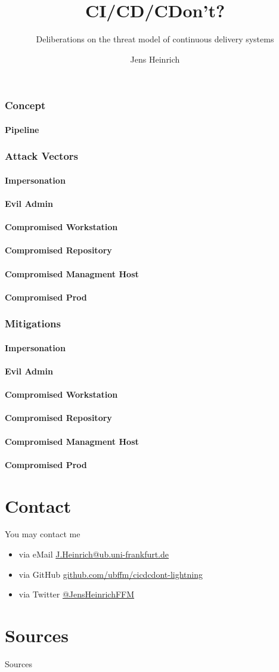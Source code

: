 \documentclass{beamer}
\title{CI/CD/CDon't?}
\subtitle{Deliberations on the threat model of continuous delivery systems}
\date[%
	{\includegraphics[
			keepaspectratio,
			height=3pt
			]
			{cyber.png}
			}%
		CiderSecCon
]{2020--03--14/15\\%
	{\includegraphics[
			keepaspectratio,
			height=7pt
			]
			{cyber.png}
			}%
		CiderSecCon}
\institute[UBFFM]{\href{https://www.ub.uni-frankfurt.de}{Universit\"atsbibliothek Johann Christian Senckenberg}}
\author[J
	{\includegraphics[
		keepaspectratio,
		height=4pt
		]
		{icon.png}
		}
		]{Jens Heinrich}
\begin{document}
\begin{frame}
	\titlepage
\end{frame}

\begin{frame}
	\frametitle<1-1>{Concept}
	\framesubtitle<1-1>{Pipeline}
	\frametitle<2-7>{Attack Vectors}
	\framesubtitle<2-2>{Impersonation}
	\framesubtitle<3-3>{Evil Admin}
	\framesubtitle<4-4>{Compromised Workstation}
	\framesubtitle<5-5>{Compromised Repository}
	\framesubtitle<6-6>{Compromised Managment Host}
	\framesubtitle<7-7>{Compromised Prod}
	\frametitle<8-13>{Mitigations}
	\framesubtitle<8-8>{Impersonation}
	\framesubtitle<9-9>{Evil Admin}
	\framesubtitle<10-10>{Compromised Workstation}
	\framesubtitle<11-11>{Compromised Repository}
	\framesubtitle<12-12>{Compromised Managment Host}
	\framesubtitle<13-13>{Compromised Prod}
	
\end{frame}

\section{Contact}
\begin{frame}
	You may contact me
	\begin{itemize}
		\item via eMail \href{mailto://J.Heinrich@ub.uni-frankfurt.de}{\url{J.Heinrich@ub.uni-frankfurt.de}} \\
		\item via GitHub \href{https://github.com/ubffm/cicdcdont-lightning}{\url{github.com/ubffm/cicdcdont-lightning}} \\
		\item via Twitter \href{https://twitter.com/JensHeinrichFFM}{@JensHeinrichFFM}
	\end{itemize}
\end{frame}

\section{Sources}
\begin{frame}[allowframebreaks]{Sources}
\nocite{*}
\printbibliography

\end{frame}
\end{document}
